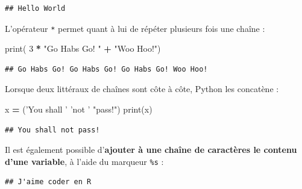 \documentclass[12pt,]{book}
\newenvironment{Shaded}{\begin{snugshade}}{\end{snugshade}}
\newcommand{\DecValTok}[1]{\textcolor[rgb]{0.00,0.00,0.81}{#1}}
\newcommand{\SpecialCharTok}[1]{\textcolor[rgb]{0.00,0.00,0.00}{#1}}
\newcommand{\StringTok}[1]{\textcolor[rgb]{0.31,0.60,0.02}{#1}}
\newcommand{\OperatorTok}[1]{\textcolor[rgb]{0.81,0.36,0.00}{\textbf{#1}}}
\newcommand{\BuiltInTok}[1]{#1}
\newcommand{\NormalTok}[1]{#1}
\numberwithin{equation}{section}
\numberwithin{countremarque}{section}
\begin{document}
\begin{lstlisting}
## Hello World
\end{lstlisting}

L'opérateur \texttt{*} permet quant à lui de répéter plusieurs fois une
chaîne :

\begin{Shaded}
\begin{Highlighting}[]
\BuiltInTok{print}\NormalTok{( }\DecValTok{3} \OperatorTok{*} \StringTok{"Go Habs Go! "} \OperatorTok{+} \StringTok{"Woo Hoo!"}\NormalTok{)}
\end{Highlighting}
\end{Shaded}

\begin{lstlisting}
## Go Habs Go! Go Habs Go! Go Habs Go! Woo Hoo!
\end{lstlisting}

Lorsque deux littéraux de chaînes sont côte à côte, Python les concatène
:

\begin{Shaded}
\begin{Highlighting}[]
\NormalTok{x }\OperatorTok{=}\NormalTok{ (}\StringTok{'You shall '} \StringTok{'not '} \StringTok{"pass!"}\NormalTok{)}
\BuiltInTok{print}\NormalTok{(x)}
\end{Highlighting}
\end{Shaded}

\begin{lstlisting}
## You shall not pass!
\end{lstlisting}

Il est également possible d'\textbf{ajouter à une chaîne de caractères
le contenu d'une variable}, à l'aide du marqueur \texttt{\%s} :

\begin{Shaded}
\end{Shaded}

\begin{lstlisting}
## J'aime coder en R
\end{lstlisting}
\end{document}
